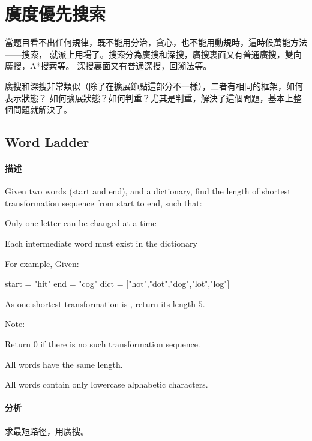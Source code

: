 \chapter{廣度優先搜索}
當題目看不出任何規律，既不能用分治，貪心，也不能用動規時，這時候萬能方法——搜索，
就派上用場了。搜索分為廣搜和深搜，廣搜裏面又有普通廣搜，雙向廣搜，A*搜索等。
深搜裏面又有普通深搜，回溯法等。

廣搜和深搜非常類似（除了在擴展節點這部分不一樣），二者有相同的框架，如何表示狀態？
如何擴展狀態？如何判重？尤其是判重，解決了這個問題，基本上整個問題就解決了。
\newline


\section{Word Ladder} %
\label{sec:word-ladder}


\subsubsection{描述}
Given two words (start and end), and a dictionary, find the length of shortest transformation sequence from start to end, such that:
\begindot
\item Only one letter can be changed at a time
\item Each intermediate word must exist in the dictionary
\myenddot

For example, Given:

\begin{Code}
start = "hit"
end = "cog"
dict = ["hot","dot","dog","lot","log"]
\end{Code}
As one shortest transformation is , return its length $5$.

Note:
\begindot
\item Return 0 if there is no such transformation sequence.
\item All words have the same length.
\item All words contain only lowercase alphabetic characters.
\myenddot


\subsubsection{分析}
求最短路徑，用廣搜。


